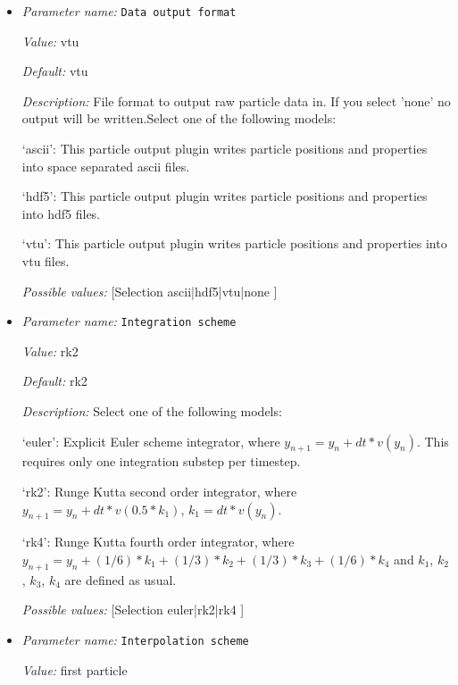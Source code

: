 \begin{itemize}
\item {\it Parameter name:} {\tt Data output format}
\label{parameters:Postprocess/Tracers/Data output format}


{\it Value:} vtu


{\it Default:} vtu


{\it Description:} File format to output raw particle data in. If you select 'none' no output will be written.Select one of the following models:

`ascii': This particle output plugin writes particle positions and properties into space separated ascii files.

`hdf5': This particle output plugin writes particle positions and properties into hdf5 files.

`vtu': This particle output plugin writes particle positions and properties into vtu files.


{\it Possible values:} [Selection ascii|hdf5|vtu|none ]
\item {\it Parameter name:} {\tt Integration scheme}
\label{parameters:Postprocess/Tracers/Integration scheme}


{\it Value:} rk2


{\it Default:} rk2


{\it Description:} Select one of the following models:

`euler': Explicit Euler scheme integrator, where $y_{n+1} = y_n + dt * v(y_n)$. This requires only one integration substep per timestep.

`rk2': Runge Kutta second order integrator, where $y_{n+1} = y_n + dt*v(0.5*k_1)$, $k_1 = dt*v(y_n)$.

`rk4': Runge Kutta fourth order integrator, where $y_{n+1} = y_n + (1/6)*k_1 + (1/3)*k_2 + (1/3)*k_3 + (1/6)*k_4$ and $k_1$, $k_2$, $k_3$, $k_4$ are defined as usual.


{\it Possible values:} [Selection euler|rk2|rk4 ]
\item {\it Parameter name:} {\tt Interpolation scheme}
\label{parameters:Postprocess/Tracers/Interpolation scheme}


{\it Value:} first particle



\end{itemize}
